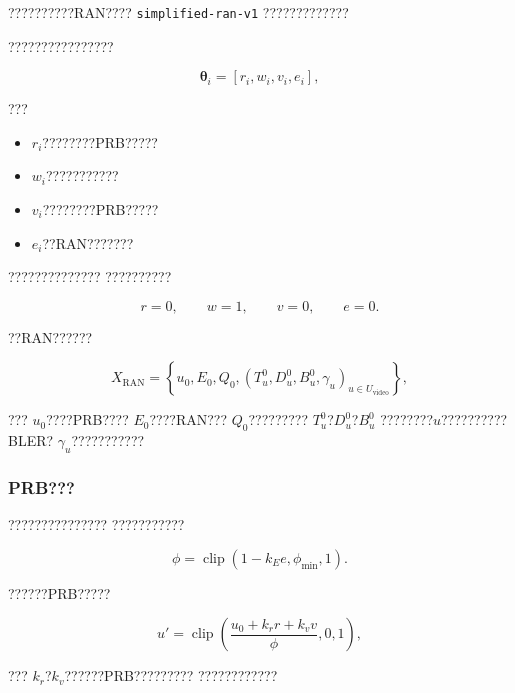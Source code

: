 ??????????RAN????
\texttt{simplified-ran-v1}
?????????????

????????????????

\begin{equation}
\boldsymbol{\theta}_i
=
\left[
r_i,
w_i,
v_i,
e_i
\right],
\label{eq:policy_parameter_vector_reduced}
\end{equation}

???

\begin{itemize}
    \item $r_i$????????PRB?????
    \item $w_i$???????????
    \item $v_i$????????PRB?????
    \item $e_i$??RAN???????
\end{itemize}

??????????????
??????????

\begin{equation}
r=0,
\qquad
w=1,
\qquad
v=0,
\qquad
e=0.
\label{eq:neutral_policy_parameters_reduced}
\end{equation}

??RAN??????

\begin{equation}
X_{\mathrm{RAN}}
=
\left\{
u_0,
E_0,
Q_0,
\left(
T_u^0,
D_u^0,
B_u^0,
\gamma_u
\right)_{u\in U_{\mathrm{video}}}
\right\},
\label{eq:ran_state_reduced}
\end{equation}

???
$u_0$????PRB????
$E_0$????RAN???
$Q_0$?????????
$T_u^0$?$D_u^0$?$B_u^0$
????????$u$??????????BLER?
$\gamma_u$???????????


\subsubsection*{PRB???}

???????????????
???????????

\begin{equation}
\phi
=
\operatorname{clip}
\left(
1-k_Ee,
\phi_{\min},
1
\right).
\label{eq:effective_capacity_reduced}
\end{equation}

??????PRB?????

\begin{equation}
u'
=
\operatorname{clip}
\left(
\frac{
u_0+k_rr+k_vv
}{
\phi
},
0,
1
\right),
\label{eq:post_policy_prb_reduced}
\end{equation}

???
$k_r$?$k_v$??????PRB?????????
????????????

